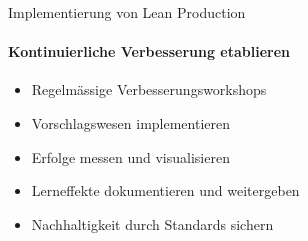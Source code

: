 \begin{KR}{Implementierung von Lean Production}
\paragraph{Kontinuierliche Verbesserung etablieren}
\begin{itemize}
    \item Regelmässige Verbesserungsworkshops
    \item Vorschlagswesen implementieren
    \item Erfolge messen und visualisieren
    \item Lerneffekte dokumentieren und weitergeben
    \item Nachhaltigkeit durch Standards sichern
\end{itemize}
\end{KR}
